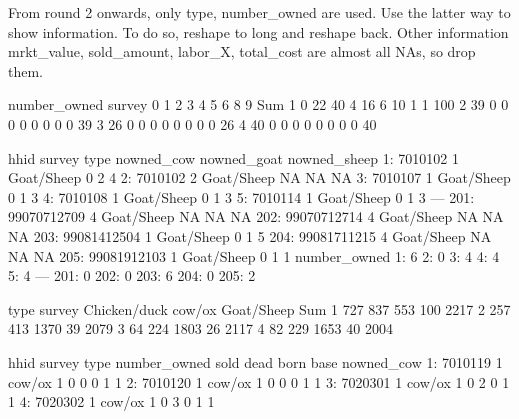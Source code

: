 From round 2 onwards, only \textsf{type}, \textsf{number\_owned} are used. Use the latter way to show information. To do so, reshape to long and reshape back. Other information \textsf{mrkt\_value, sold\_amount, labor\_X, total\_cost} are almost all NAs, so drop them.
\begin{Schunk}
\begin{Soutput}
      number_owned
survey   0   1   2   3   4   5   6   8   9 Sum
     1   0  22  40   4  16   6  10   1   1 100
     2  39   0   0   0   0   0   0   0   0  39
     3  26   0   0   0   0   0   0   0   0  26
     4  40   0   0   0   0   0   0   0   0  40
\end{Soutput}
\begin{Soutput}
            hhid survey       type nowned_cow nowned_goat nowned_sheep
  1:     7010102      1 Goat/Sheep          0           2            4
  2:     7010102      2 Goat/Sheep         NA          NA           NA
  3:     7010107      1 Goat/Sheep          0           1            3
  4:     7010108      1 Goat/Sheep          0           1            3
  5:     7010114      1 Goat/Sheep          0           1            3
 ---                                                                  
201: 99070712709      4 Goat/Sheep         NA          NA           NA
202: 99070712714      4 Goat/Sheep         NA          NA           NA
203: 99081412504      1 Goat/Sheep          0           1            5
204: 99081711215      4 Goat/Sheep         NA          NA           NA
205: 99081912103      1 Goat/Sheep          0           1            1
     number_owned
  1:            6
  2:            0
  3:            4
  4:            4
  5:            4
 ---             
201:            0
202:            0
203:            6
204:            0
205:            2
\end{Soutput}
\begin{Soutput}
      type
survey      Chicken/duck cow/ox Goat/Sheep  Sum
     1  727          837    553        100 2217
     2  257          413   1370         39 2079
     3   64          224   1803         26 2117
     4   82          229   1653         40 2004
\end{Soutput}
\begin{Soutput}
            hhid survey   type number_owned sold dead born base nowned_cow
  1:     7010119      1 cow/ox            1    0    0    0    1          1
  2:     7010120      1 cow/ox            1    0    0    0    1          1
  3:     7020301      1 cow/ox            1    0    2    0    1          1
  4:     7020302      1 cow/ox            1    0    3    0    1          1

\end{Soutput}
\end{Schunk}
